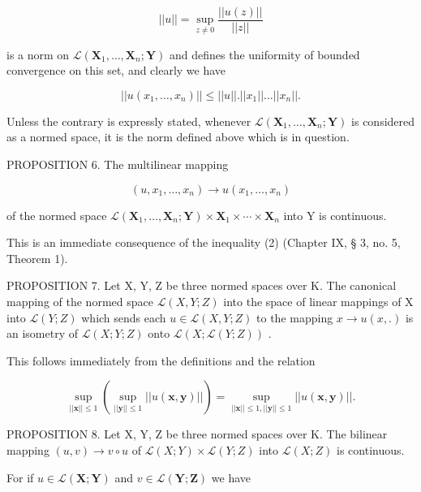 \[
\left| \left| u \right| \right| = \sup _ {z \neq 0} \frac {\left| \left| u (z) \right| \right|}{\left| \left| z \right| \right|}
\]

is a norm on \(\mathcal{L}(\mathbf{X}_1, \ldots, \mathbf{X}_n; \mathbf{Y})\) and defines the uniformity of bounded convergence on this set, and clearly we have

\[
\left| \left| u \left(x _ {1}, \dots , x _ {n}\right) \right| \right| \leqslant \left| \left| u \right| \right|. \left| \left| x _ {1} \right| \right| \dots \left| \left| x _ {n} \right| \right|.\tag{2}
\]

Unless the contrary is expressly stated, whenever \(\mathcal{L}(\mathbf{X}_1,\ldots ,\mathbf{X}_n;\mathbf{Y})\) is considered as a normed space, it is the norm defined above which is in question.

PROPOSITION 6. The multilinear mapping

\[
(u, x _ {1}, \dots , x _ {n}) \rightarrow u (x _ {1}, \dots , x _ {n})
\]

of the normed space \(\mathcal{L}(\mathbf{X}_{1},\ldots,\mathbf{X}_{n};\mathbf{Y})\times\mathbf{X}_{1}\times\cdots\times\mathbf{X}_{n}\) into Y is continuous.

This is an immediate consequence of the inequality (2) (Chapter IX, § 3, no. 5, Theorem 1).

PROPOSITION 7. Let X, Y, Z be three normed spaces over K. The canonical mapping of the normed space \(\mathscr{L}(X, Y; Z)\) into the space of linear mappings of X into \(\mathscr{L}(Y; Z)\) which sends each \(u \in \mathscr{L}(X, Y; Z)\) to the mapping \(x \to u(x, .)\) is an isometry of \(\mathscr{L}(X; Y; Z)\) onto \(\mathscr{L}(X; \mathscr{L}(Y; Z))\) .

This follows immediately from the definitions and the relation

\[
\sup _ {| | \boldsymbol {x} | | \leqslant 1} \left(\sup _ {| | \boldsymbol {y} | | \leqslant 1} | | u (\boldsymbol {x}, \boldsymbol {y}) | |\right) = \sup _ {| | \boldsymbol {x} | | \leqslant 1, | | \boldsymbol {y} | | \leqslant 1} | | u (\boldsymbol {x}, \boldsymbol {y}) | |.
\]

PROPOSITION 8. Let X, Y, Z be three normed spaces over K. The bilinear mapping \((u, v) \to v \circ u\) of \(\mathcal{L}(X; Y) \times \mathcal{L}(Y; Z)\) into \(\mathcal{L}(X; Z)\) is continuous.

For if \(u \in \mathcal{L}(\mathbf{X};\mathbf{Y})\) and \(v \in \mathcal{L}(\mathbf{Y};\mathbf{Z})\) we have

